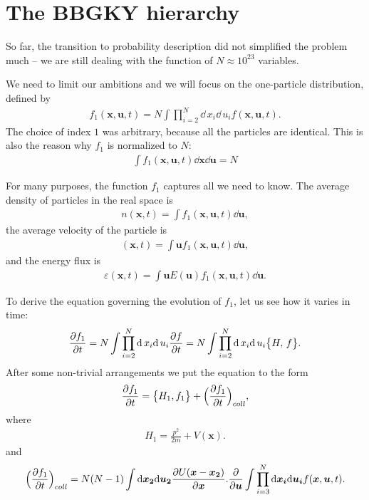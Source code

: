 \section{The BBGKY hierarchy}
So far, the transition to probability description did not simplified the problem much -- we are still dealing with the function of $N \approx 10^{23}$ variables.

We need to limit our ambitions and we will focus on the one-particle distribution, defined by
\begin{align} \label{1pd}
f_1(\bm{x},\bm{u},t) = N \int \prod_{i=2}^N \dd \, x_i \dd \, u_i f(\bm{x},\bm{u},t).
\end{align}
The choice of index $1$ was arbitrary, because all the particles are identical. This is also the reason why $f_1$ is normalized to $N$:
\begin{align*}
\int f_1(\bm{x},\bm{u},t) \dd \bm{x} \dd \bm{u} = N
\end{align*}

For many purposes, the function $f_1$ captures all we need to know.
The average density of particles in the real space is
\begin{align} \label{partdens}
n(\bm{x},t) = \int f_1(\bm{x},\bm{u},t) \dd \bm{u},
\end{align}
the average velocity of the particle is
\begin{align*}
(\bm{x},t) = \int \bm{u} f_1(\bm{x},\bm{u},t) \dd \bm{u},
\end{align*}
and the energy flux is
\begin{align*}
\varepsilon(\bm{x},t) = \int \bm{u} E(\bm{u}) f_1(\bm{x},\bm{u},t) \dd \bm{u}.
\end{align*}

To derive the equation governing the evolution of $f_1$, let us see how it varies in time:
\begin{align*}
\frac{\partial f_1}{\partial t} = N \int \prod_{i=2}^N \mathrm{d} \, x_i \mathrm{d} \, u_i \frac{\partial f}{\partial t} = N \int \prod_{i=2}^N \mathrm{d} \, x_i \mathrm{d} \, u_i \big\{ H, \, f \big\}.
\end{align*}
After some non-trivial arrangements we put the equation to the form
\begin{align} \label{boltzman}
\frac{\partial f_1}{\partial t} = \big\{ H_1, f_1 \big\} + \Big(\frac{\partial f_1}{\partial t} \Big)_{coll},
\end{align}
where
\begin{align*}
H_1 = \frac{p^2}{2m} + V(\bm{x}).
\end{align*}
and
\begin{align*}
\Big(\frac{\partial f_1}{\partial t} \Big)_{coll} = N(N-1) \int \mathrm{d} \bm{x_2} \mathrm{d} \bm{u_2} 
\frac{\partial U(\bm{x} - \bm{x_2})}{\partial {\bm{x}}} . \frac{\partial}{\partial \bm{u}} \int \prod_{i=3}^N \mathrm{d} \bm{x_i} \mathrm{d}\bm{u_i} f(\bm{x},\bm{u},t).
\end{align*}

